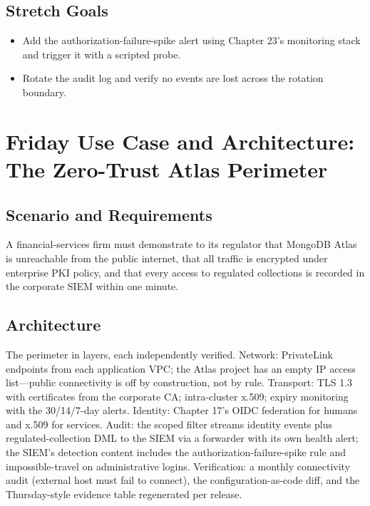 \subsection*{Stretch Goals}
\begin{itemize}
    \item Add the authorization-failure-spike alert using Chapter 23's monitoring stack and trigger it with a scripted probe.
    \item Rotate the audit log and verify no events are lost across the rotation boundary.
\end{itemize}

\section{Friday Use Case and Architecture: The Zero-Trust Atlas Perimeter}
\subsection{Scenario and Requirements}
A financial-services firm must demonstrate to its regulator that MongoDB Atlas is unreachable from the public internet, that all traffic is encrypted under enterprise PKI policy, and that every access to regulated collections is recorded in the corporate SIEM within one minute.

\subsection{Architecture}
The perimeter in layers, each independently verified. Network: PrivateLink endpoints from each application VPC; the Atlas project has an empty IP access list---public connectivity is off by construction, not by rule. Transport: TLS 1.3 with certificates from the corporate CA; intra-cluster x.509; expiry monitoring with the 30/14/7-day alerts. Identity: Chapter 17's OIDC federation for humans and x.509 for services. Audit: the scoped filter streams identity events plus regulated-collection DML to the SIEM via a forwarder with its own health alert; the SIEM's detection content includes the authorization-failure-spike rule and impossible-travel on administrative logins. Verification: a monthly connectivity audit (external host must fail to connect), the configuration-as-code diff, and the Thursday-style evidence table regenerated per release.

